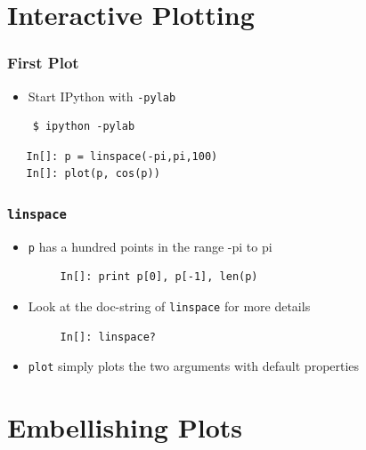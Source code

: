 \section{Interactive Plotting}

\begin{frame}[fragile]
  \frametitle{First Plot}
  \begin{itemize}
  \item Start IPython with \texttt{-pylab}
  \end{itemize}
  \begin{lstlisting}
    $ ipython -pylab
  \end{lstlisting}  %
  \begin{lstlisting}
   In[]: p = linspace(-pi,pi,100) 
   In[]: plot(p, cos(p))
  \end{lstlisting}
\end{frame}


\begin{frame}[fragile]
  \frametitle{\texttt{linspace}}
  \begin{itemize}
  \item \texttt{p} has a hundred points in the range -pi to pi
    \begin{lstlisting}
     In[]: print p[0], p[-1], len(p)
    \end{lstlisting}
  \item Look at the doc-string of \texttt{linspace} for more details
    \begin{lstlisting}
     In[]: linspace?
    \end{lstlisting}
  \end{itemize}
  \begin{itemize}
  \item \texttt{plot} simply plots the two arguments with default
    properties 
  \end{itemize}
\end{frame}

\section{Embellishing Plots}

